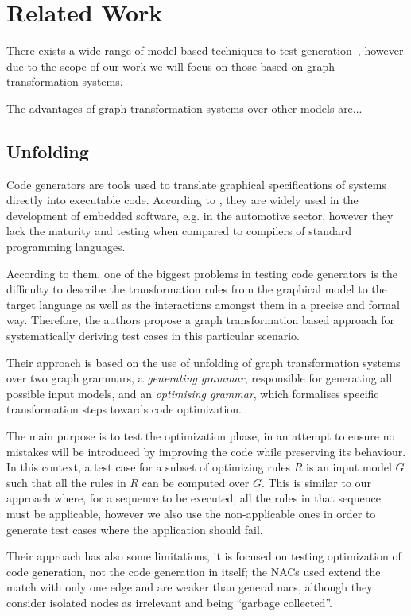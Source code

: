 \chapter{Related Work}\label{ch:related-work}

There exists a wide range of model-based techniques to test generation~\cite{Utting2006}, however due to the scope of our work we will focus on those based on graph transformation systems.

The advantages of graph transformation systems over other models are...

\section{Unfolding}

Code generators are tools used to translate graphical specifications of systems directly into executable code. According to \cite{Baldan2004}, they are widely used in the development of embedded software, e.g. in the automotive sector, however they lack the maturity and testing when compared to compilers of standard programming languages.

According to them, one of the biggest problems in testing code generators is the difficulty to describe the transformation rules from the graphical model to the target language as well as the interactions amongst them in a precise and formal way. Therefore, the authors propose a graph transformation based approach for systematically deriving test cases in this particular scenario.

Their approach is based on the use of unfolding of graph transformation systems~\cite{Ribeiro1996} over two graph grammars, a \textit{generating grammar}, responsible for generating all possible input models, and an \textit{optimising grammar}, which formalises specific transformation steps towards code optimization.

The main purpose is to test the optimization phase, in an attempt to ensure no mistakes will be introduced by improving the code while preserving its behaviour. In this context, a test case for a subset of optimizing rules $R$ is an input model $G$ such that all the rules in $R$ can be computed over $G$. This is similar to our approach where, for a sequence to be executed, all the rules in that sequence must be applicable, however we also use the non-applicable ones in order to generate test
cases where the application should fail.

Their approach has also some limitations, it is focused on testing optimization of code generation, not the code generation in itself; the NACs used extend the match with only one edge and are weaker than general nacs, although they consider isolated nodes as irrelevant and being ``garbage collected''.


